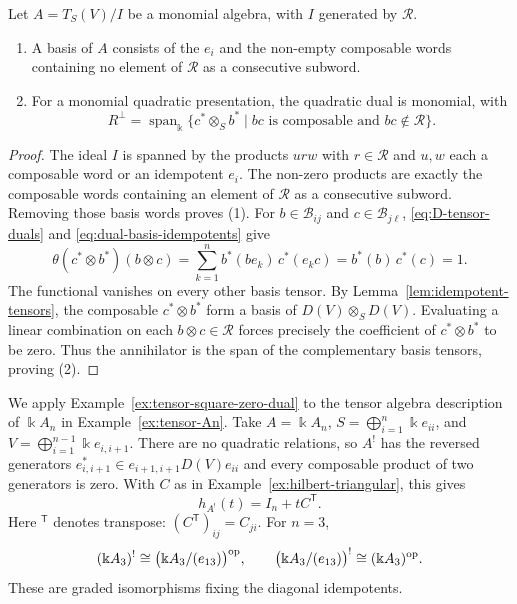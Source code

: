 \begin{advanced}
\begin{proposition}\label{prop:monomial-dual}
Let $A=T_S(V)/I$ be a monomial algebra, with $I$ generated by $\mathcal R$.
\begin{enumerate}
\item A basis of $A$ consists of the $e_i$ and the non-empty composable words containing no element of $\mathcal R$ as a consecutive subword.
\item For a monomial quadratic presentation, the quadratic dual is monomial, with
\begin{equation}\label{eq:monomial-dual}
R^\perp=\operatorname{span}_\Bbbk
\{c^*\otimes_S b^*\mid bc\text{ is composable and }bc\notin\mathcal R\}.
\end{equation}
\end{enumerate}
\end{proposition}

\begin{proof}
The ideal $I$ is spanned by the products $urw$ with $r\in\mathcal R$ and $u,w$ each a composable word or an idempotent $e_i$.
The non-zero products are exactly the composable words containing an element of $\mathcal R$ as a consecutive subword.
Removing those basis words proves (1).
For $b\in\mathcal B_{ij}$ and $c\in\mathcal B_{j\ell}$, \eqref{eq:D-tensor-duals} and \eqref{eq:dual-basis-idempotents} give
\[
\theta(c^*\otimes b^*)(b\otimes c)=\sum_{k=1}^n b^*(be_k)\,c^*(e_kc)=b^*(b)\,c^*(c)=1.
\]
The functional vanishes on every other basis tensor.
By Lemma~\ref{lem:idempotent-tensors}, the composable $c^*\otimes b^*$ form a basis of $D(V)\otimes_S D(V)$.
Evaluating a linear combination on each $b\otimes c\in\mathcal R$ forces precisely the coefficient of $c^*\otimes b^*$ to be zero.
Thus the annihilator is the span of the complementary basis tensors, proving (2).
\end{proof}

\begin{example}\label{ex:An-quadratic-dual}
We apply Example~\ref{ex:tensor-square-zero-dual} to the tensor algebra description of $\Bbbk A_n$ in Example~\ref{ex:tensor-An}.
Take $A=\Bbbk A_n$, $S=\bigoplus_{i=1}^n\Bbbk e_{ii}$, and $V=\bigoplus_{i=1}^{n-1}\Bbbk e_{i,i+1}$.
There are no quadratic relations, so $A^!$ has the reversed generators $e_{i,i+1}^*\in e_{i+1,i+1}D(V)e_{ii}$ and every composable product of two generators is zero.
With $C$ as in Example~\ref{ex:hilbert-triangular}, this gives
\[
h_{A^!}(t)=I_n+tC^{\mathsf T}.
\]
Here ${}^{\mathsf T}$ denotes transpose: $(C^{\mathsf T})_{ij}=C_{ji}$.
For $n=3$,
\[
(\Bbbk A_3)^!\cong\bigl(\Bbbk A_3/(e_{13})\bigr)^{\mathrm{op}},
\qquad
\bigl(\Bbbk A_3/(e_{13})\bigr)^!\cong(\Bbbk A_3)^{\mathrm{op}}.
\]
These are graded isomorphisms fixing the diagonal idempotents.
\end{example}


\end{advanced}
